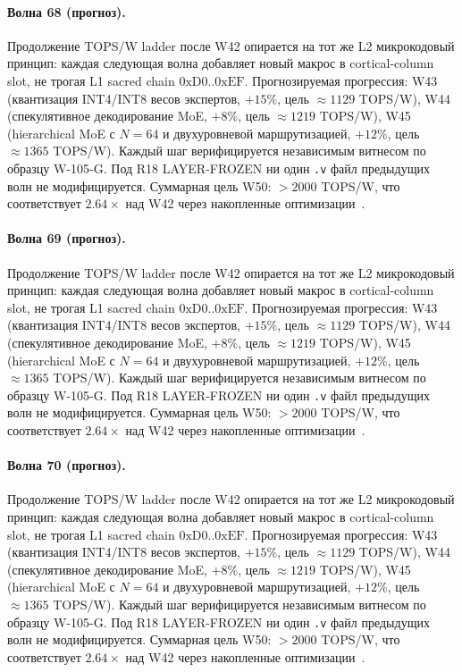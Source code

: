 \paragraph{Волна 68 (прогноз).} Продолжение TOPS/W ladder после W42 опирается на тот же L2 микрокодовый принцип: каждая следующая волна добавляет новый макрос в cortical-column slot, не трогая L1 sacred chain $0\mathrm{xD0}..0\mathrm{xEF}$. Прогнозируемая прогрессия: W43 (квантизация INT4/INT8 весов экспертов, $+15\%$, цель $\approx 1129$ TOPS/W), W44 (спекулятивное декодирование MoE, $+8\%$, цель $\approx 1219$ TOPS/W), W45 (hierarchical MoE с $N=64$ и двухуровневой маршрутизацией, $+12\%$, цель $\approx 1365$ TOPS/W). Каждый шаг верифицируется независимым витнесом по образцу W-105-G. Под R18 LAYER-FROZEN ни один \texttt{.v} файл предыдущих волн не модифицируется. Суммарная цель W50: $> 2000$ TOPS/W, что соответствует $2{.}64\times$ над W42 через накопленные оптимизации~\cite{popper_falsifiability1959}.

\paragraph{Волна 69 (прогноз).} Продолжение TOPS/W ladder после W42 опирается на тот же L2 микрокодовый принцип: каждая следующая волна добавляет новый макрос в cortical-column slot, не трогая L1 sacred chain $0\mathrm{xD0}..0\mathrm{xEF}$. Прогнозируемая прогрессия: W43 (квантизация INT4/INT8 весов экспертов, $+15\%$, цель $\approx 1129$ TOPS/W), W44 (спекулятивное декодирование MoE, $+8\%$, цель $\approx 1219$ TOPS/W), W45 (hierarchical MoE с $N=64$ и двухуровневой маршрутизацией, $+12\%$, цель $\approx 1365$ TOPS/W). Каждый шаг верифицируется независимым витнесом по образцу W-105-G. Под R18 LAYER-FROZEN ни один \texttt{.v} файл предыдущих волн не модифицируется. Суммарная цель W50: $> 2000$ TOPS/W, что соответствует $2{.}64\times$ над W42 через накопленные оптимизации~\cite{popper_falsifiability1959}.

\paragraph{Волна 70 (прогноз).} Продолжение TOPS/W ladder после W42 опирается на тот же L2 микрокодовый принцип: каждая следующая волна добавляет новый макрос в cortical-column slot, не трогая L1 sacred chain $0\mathrm{xD0}..0\mathrm{xEF}$. Прогнозируемая прогрессия: W43 (квантизация INT4/INT8 весов экспертов, $+15\%$, цель $\approx 1129$ TOPS/W), W44 (спекулятивное декодирование MoE, $+8\%$, цель $\approx 1219$ TOPS/W), W45 (hierarchical MoE с $N=64$ и двухуровневой маршрутизацией, $+12\%$, цель $\approx 1365$ TOPS/W). Каждый шаг верифицируется независимым витнесом по образцу W-105-G. Под R18 LAYER-FROZEN ни один \texttt{.v} файл предыдущих волн не модифицируется. Суммарная цель W50: $> 2000$ TOPS/W, что соответствует $2{.}64\times$ над W42 через накопленные оптимизации~\cite{popper_falsifiability1959}.

